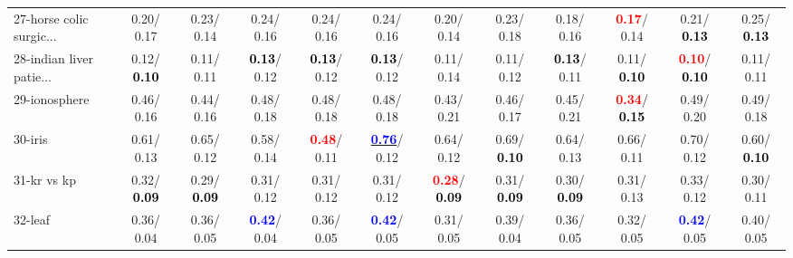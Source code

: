 \begin{table}[h]
\begin{center}
{\begin{tabular}{lc|c|c|c|c|c|c|c|c|c|c}
27-horse colic surgic... &   0.20/  0.17 &   0.23/  0.14 &   0.24/  0.16 &   0.24/  0.16 &   0.24/  0.16 &   0.20/  0.14 &   0.23/  0.18 &   0.18/  0.16 & \textcolor{red}{\textbf{  0.17}}/  0.14 &   0.21/\textcolor{black}{\textbf{  0.13}} &   0.25/\textcolor{black}{\textbf{  0.13}} \\
28-indian liver patie... &   0.12/\textcolor{black}{\textbf{  0.10}} &   0.11/  0.11 & \textcolor{black}{\textbf{  0.13}}/  0.12 & \textcolor{black}{\textbf{  0.13}}/  0.12 & \textcolor{black}{\textbf{  0.13}}/  0.12 &   0.11/  0.14 &   0.11/  0.12 & \textcolor{black}{\textbf{  0.13}}/  0.11 &   0.11/\textcolor{black}{\textbf{  0.10}} & \textcolor{red}{\textbf{  0.10}}/\textcolor{black}{\textbf{  0.10}} &   0.11/  0.11 \\ \hline
29-ionosphere &   0.46/  0.16 &   0.44/  0.16 &   0.48/  0.18 &   0.48/  0.18 &   0.48/  0.18 &   0.43/  0.21 &   0.46/  0.17 &   0.45/  0.21 & \textcolor{red}{\textbf{  0.34}}/\textcolor{black}{\textbf{  0.15}} &   0.49/  0.20 &   0.49/  0.18 \\
30-iris &   0.61/  0.13 &   0.65/  0.12 &   0.58/  0.14 & \textcolor{red}{\textbf{  0.48}}/  0.11 & \underline{\textcolor{blue}{\textbf{  0.76}}}/  0.12 &   0.64/  0.12 &   0.69/\textcolor{black}{\textbf{  0.10}} &   0.64/  0.13 &   0.66/  0.11 &   0.70/  0.12 &   0.60/\textcolor{black}{\textbf{  0.10}} \\
31-kr vs kp &   0.32/\textcolor{black}{\textbf{  0.09}} &   0.29/\textcolor{black}{\textbf{  0.09}} &   0.31/  0.12 &   0.31/  0.12 &   0.31/  0.12 & \textcolor{red}{\textbf{  0.28}}/\textcolor{black}{\textbf{  0.09}} &   0.31/\textcolor{black}{\textbf{  0.09}} &   0.30/\textcolor{black}{\textbf{  0.09}} &   0.31/  0.13 &   0.33/  0.12 &   0.30/  0.11 \\
32-leaf &   0.36/  0.04 &   0.36/  0.05 & \textcolor{blue}{\textbf{  0.42}}/  0.04 &   0.36/  0.05 & \textcolor{blue}{\textbf{  0.42}}/  0.05 &   0.31/  0.05 &   0.39/  0.04 &   0.36/  0.05 &   0.32/  0.05 & \textcolor{blue}{\textbf{  0.42}}/  0.05 &   0.40/  0.05 \\\end{tabular}}\label{stratsALCKappa0aCIELM}
\end{center}
\end{table}
